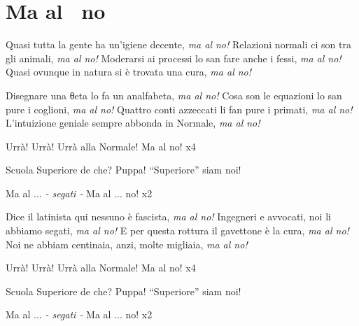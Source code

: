 \section{Ma al \santanna\ no}
\begin{canzone}
Quasi tutta la gente ha un'igiene decente,
\textit{ma al \santanna no!}
Relazioni normali ci son tra gli animali,
\textit{ma al \santanna no!}
Moderarsi ai processi lo san fare anche i fessi,
\textit{ma al \santanna no!}
Quasi ovunque in natura si è trovata una cura,
\textit{ma al \santanna no!}

Disegnare una {θ}eta lo fa un analfabeta,
\textit{ma al \santanna no!}
Cosa son le equazioni lo san pure i coglioni,
\textit{ma al \santanna no!}
Quattro conti azzeccati li fan pure i primati,
\textit{ma al \santanna no!}
L'intuizione geniale sempre abbonda in Normale,
\textit{ma al \santanna no!}

Urrà! Urrà! Urrà alla Normale!
Ma al \santanna no! \hspace{5em} {\small x4}
\begin{flushright} Scuola Superiore de che?
	Puppa! “Superiore” siam noi!
\end{flushright}Ma al \santanna... \hspace{1.5em} \textit{- segati -}
Ma al \santanna... no! \hspace{4em} {\small x2}

Dice il latinista qui nessuno è fascista,
\textit{ma al \santanna no!}
Ingegneri e avvocati, noi li abbiamo segati,
\textit{ma al \santanna no!}
E per questa rottura il gavettone è la cura,
\textit{ma al \santanna no!}
Noi ne abbiam centinaia, anzi, molte migliaia,
\textit{ma al \santanna no!}

Urrà! Urrà! Urrà alla Normale!
Ma al \santanna no! \hspace{5em} {\small x4}
\begin{flushright} Scuola Superiore de che?
Puppa! “Superiore” siam noi!
\end{flushright}Ma al \santanna... \hspace{1.5em} \textit{- segati -}
Ma al \santanna... no! \hspace{4em} {\small x2}
\end{canzone}
